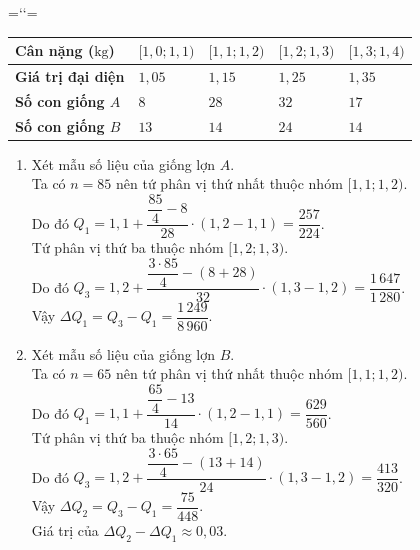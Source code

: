 \begin{bt}
{\begin{center}
			\setlength{\extrarowheight}{2pt}
			\chardef\catAtCu=\catcode`\@\relax{}\catcode`\@=\catAtCu\relax 
			\let\PBS=\PreBackslash
			\begin{tabular}{|>{\PBS\centering}m{4cm}|>{\PBS\centering}m{2cm}|>{\PBS\centering}m{2cm}| >{\PBS\centering}m{2cm}|>{\PBS\centering}m{2cm}|}\hline
				\textbf{Cân nặng ($\mathrm{kg}$)} &$[1{,}0;1{,}1)$&$[1{,}1;1{,}2)$&$[1{,}2;1{,}3)$&$[1{,}3;1{,}4)$\\
				\hline
				\textbf{Giá trị đại diện}&$1{,}05$&$1{,}15$&$1{,}25$&$1{,}35$\\
				\hline
				\textbf{Số con giống $A$}&$8$&$28$&$32$&$17$\\
				\hline
				\textbf{Số con giống $B$}&$13$&$14$&$24$&$14$\\
				\hline
			\end{tabular}
		\end{center} 
		\begin{enumerate}[$\bullet$]
			\item Xét mẫu số liệu của giống lợn $A$.\\
			Ta có $n=85$ nên tứ phân vị thứ nhất thuộc nhóm $[1{,}1;1{,}2)$.\\
			Do đó $Q_1=1{,}1+\dfrac{\dfrac{85}{4}-8}{28}\cdot (1{,}2-1{,}1)=\dfrac{257}{224}$.\\
			Tứ phân vị thứ ba thuộc nhóm $[1{,}2;1{,}3)$.\\
			Do đó $Q_3=1{,}2+\dfrac{\dfrac{3\cdot 85}{4}-(8+28)}{32}\cdot (1{,}3-1{,}2)=\dfrac{1\,647}{1\,280}$.\\
			Vậy $\Delta Q_1=Q_3-Q_1=\dfrac{1\,249}{8\,960}.$
			\item Xét mẫu số liệu của giống lợn $B$.\\
			Ta có $n=65$ nên tứ phân vị thứ nhất thuộc nhóm $[1{,}1;1{,}2)$.\\
			Do đó $Q_1=1{,}1+\dfrac{\dfrac{65}{4}-13}{14}\cdot (1{,}2-1{,}1)=\dfrac{629}{560}$.\\
			Tứ phân vị thứ ba thuộc nhóm $[1{,}2;1{,}3)$.\\
			Do đó $Q_3=1{,}2+\dfrac{\dfrac{3\cdot 65}{4}-(13+14)}{24}\cdot (1{,}3-1{,}2)=\dfrac{413}{320}$.\\
			Vậy $\Delta Q_2=Q_3-Q_1=\dfrac{75}{448}$.\\
			Giá trị của $\Delta Q_2-\Delta Q_1\approx 0{,}03$.
		\end{enumerate}
	}
\end{bt}

